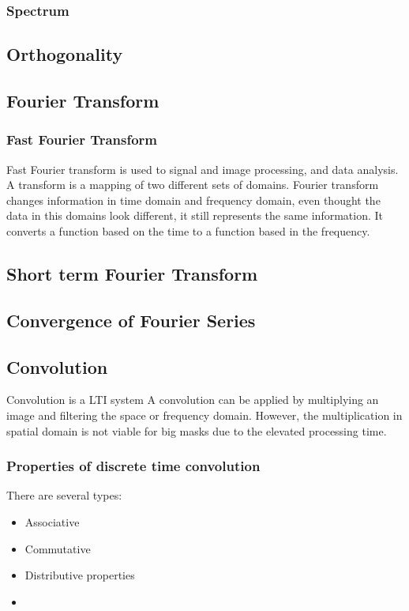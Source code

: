 \subsubsection{Spectrum}
\subsection{Orthogonality}
\subsection{Fourier Transform}
\subsubsection{Fast Fourier Transform}
Fast Fourier transform is used to signal and image processing, and data analysis.
A transform is a mapping of two different sets of domains. Fourier transform changes information in time domain and frequency domain, even thought the data in this domains look different, it still represents the same information. It converts a function based on the time to a function based in the frequency. 
\subsection{Short term Fourier Transform}
\subsection{Convergence of Fourier Series}
\subsection{Convolution}
Convolution is a LTI system
A convolution can be applied by multiplying an image and filtering the space or frequency domain. However, the multiplication in spatial domain is not viable for big masks due to the elevated processing time. 


\subsubsection{Properties of discrete time convolution}
There are several types:
\begin{itemize}
\item Associative
\item Commutative
\item Distributive properties
\item 
\end{itemize}

